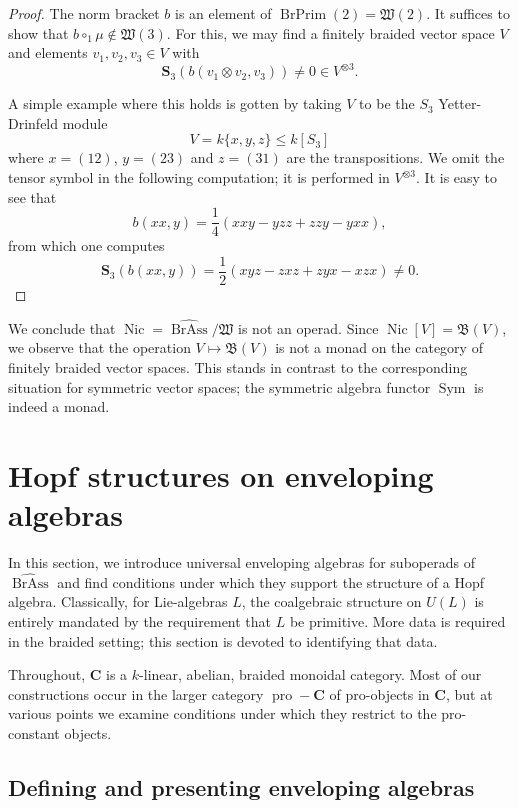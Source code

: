 \documentclass[12pt]{article}
\DeclareMathOperator{\Nic}{Nic}
\DeclareMathOperator{\Sym}{Sym}
\DeclareMathOperator{\pro}{pro}
\DeclareMathOperator{\BrAss}{BrAss}
\DeclareMathOperator{\BrPrim}{BrPrim}
\newcommand{\BrAsshat}{\widehat{\BrAss}} %
\newcommand{\bC} {\mathbf{C}}
\newcommand{\proC}{\pro\!-\bC}
\newcommand{\bS} {\mathbf{S}}
\newcommand{\mB}{\mathfrak{B}}
\newcommand{\mW}{\mathfrak{W}}
\theoremstyle{plain}
\theoremstyle{definition}
\theoremstyle{remark}
\begin{document}
\begin{proof}

The norm bracket $b$ is an element of $\BrPrim(2) = \mW(2)$.  It suffices to show that $b \circ_1 \mu \notin \mW(3)$.  For this, we may find a finitely braided vector space $V$ and elements $v_1, v_2, v_3 \in V$ with 
%
$$\bS_3(b(v_1 \otimes v_2, v_3)) \neq 0 \in V^{\otimes 3}.$$

A simple example where this holds is gotten by taking $V$ to be the $S_3$ Yetter-Drinfeld module 
%
$$V = k\{x, y, z\} \leq k[S_3]$$
%
where $x = (12)$, $y = (23)$ and $z = (31)$ are the transpositions.  We omit the tensor symbol in the following computation; it is performed in $V^{\otimes 3}$.  It is easy to see that %
%
$$b(xx, y) = \frac{1}{4}(xxy - yzz+zzy-yxx),$$
%
from which one computes
%
$$\bS_3(b(xx, y)) = \frac{1}{2}(xyz-zxz+zyx-xzx) \neq 0.$$

\end{proof}

We conclude that $\Nic = \BrAsshat/\mW$ is not an operad.  Since $\Nic[V] = \mB(V)$, we observe that the operation $V \mapsto \mB(V)$ is not a monad on the category of finitely braided vector spaces.  This stands in contrast to the corresponding situation for symmetric vector spaces; the symmetric algebra functor $\Sym$ is indeed a monad.


\section{Hopf structures on enveloping algebras}

In this section, we introduce universal enveloping algebras for suboperads of $\BrAsshat$ and find conditions under which they support the structure of a Hopf algebra.   Classically, for Lie-algebras $L$, the coalgebraic structure on $U(L)$ is entirely mandated by the requirement that $L$ be primitive. More data is required in the braided setting; this section is devoted to identifying that data.

Throughout, $\bC$ is a $k$-linear, abelian, braided monoidal category.  Most of our constructions occur in the larger category $\proC$ of pro-objects in $\bC$, but at various points we examine conditions under which they restrict to the pro-constant objects.

\subsection{Defining and presenting enveloping algebras} 
\end{document}
